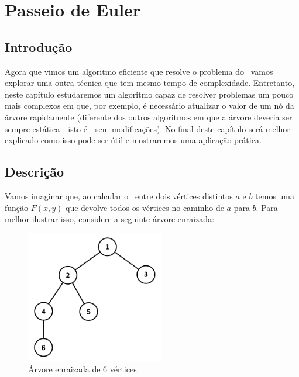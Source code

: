 \chapter{Passeio de Euler}
\label{cap:passeio-euler}

\section{Introdução}

Agora que vimos um algoritmo eficiente que resolve o problema do \LCA\, vamos explorar uma outra técnica que tem mesmo tempo de complexidade. Entretanto, neste capítulo estudaremos um algoritmo capaz de resolver problemas um pouco mais complexos em que, por exemplo, é necessário atualizar o valor de um nó da árvore rapidamente (diferente dos outros algoritmos em que a árvore deveria ser sempre estática - isto é - sem modificações). No final deste capítulo será melhor explicado como isso pode ser útil e mostraremos uma aplicação prática.


\section{Descrição}

Vamos imaginar que, ao calcular o \LCA\ entre dois vértices distintos $a$ e $b$ temos uma função $F(x, y)$ que devolve todos os vértices no caminho de $a$ para $b$. Para melhor ilustrar isso, considere a seguinte árvore enraizada:

\vspace{0.5cm}

\begin{figure}[htb]
\begin{center}
\includegraphics[width=6cm]{images/graph_euler.png}
\end{center}
\caption{\label{fig:arvore-euler}Árvore enraizada de 6 vértices}
\end{figure}

